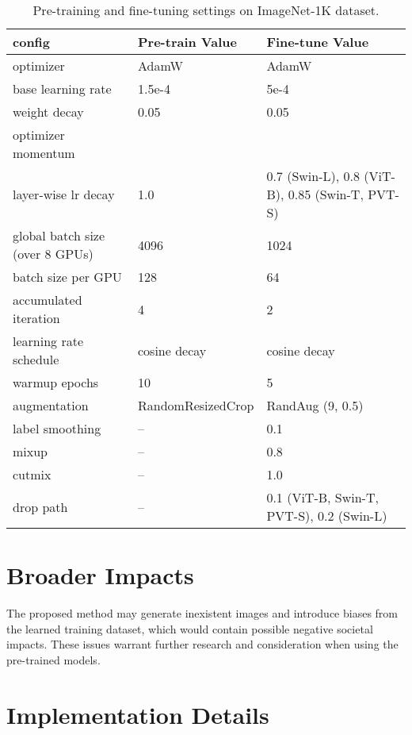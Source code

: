 \documentclass{article}
\begin{document}
\begin{table}
	\vspace{0pt}
    \renewcommand\arraystretch{1.2}
\footnotesize
    \centering
    \resizebox{0.96\textwidth}{!}
    {
        \begin{tabular}{l|l|l}
        \hline
config & Pre-train Value & Fine-tune Value \\\hline
optimizer & AdamW  & AdamW \\
base learning rate & 1.5e-4 & 5e-4\\
weight decay & 0.05 & 0.05 \\
optimizer momentum &   &  \\
layer-wise lr decay & 1.0 & 0.7 (Swin-L), 0.8 (ViT-B), 0.85 (Swin-T, PVT-S) \\
global batch size (over 8 GPUs) & 4096 & 1024 \\
batch size per GPU & 128 & 64\\
accumulated iteration & 4 & 2 \\
learning rate schedule & cosine decay & cosine decay\\
warmup epochs  & 10 & 5 \\
augmentation & RandomResizedCrop &  RandAug (9, 0.5)\\
label smoothing & -- & 0.1 \\
mixup  & -- & 0.8 \\
cutmix  & -- & 1.0 \\
drop path & -- & 0.1 (ViT-B, Swin-T, PVT-S), 0.2 (Swin-L) \\
\hline
        \end{tabular}
    }
	\vspace{2pt}
    \caption{Pre-training and fine-tuning settings on ImageNet-1K dataset.
    }
    \label{table_sm_pretrain_finetune_IN1K}
	\vspace{-16pt}
\end{table}


\section{Broader Impacts}
The proposed method may generate inexistent images and introduce biases from the learned training dataset, which would contain possible negative societal impacts. These issues warrant further research and consideration when using the pre-trained models.


\section{Implementation Details}
\end{document}
